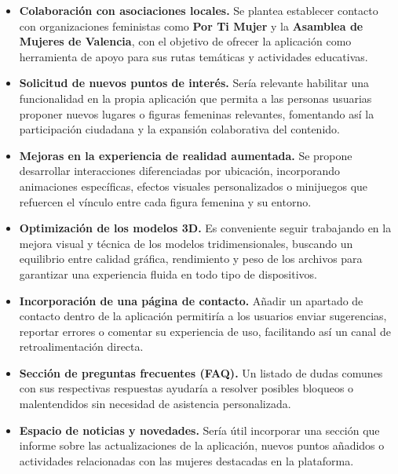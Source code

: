 \begin{itemize}
    \item \textbf{Colaboración con asociaciones locales.} Se plantea establecer contacto con organizaciones feministas como \textbf{Por Ti Mujer} y la \textbf{Asamblea de Mujeres de Valencia}, con el objetivo de ofrecer la aplicación como herramienta de apoyo para sus rutas temáticas y actividades educativas.

    \item \textbf{Solicitud de nuevos puntos de interés.} Sería relevante habilitar una funcionalidad en la propia aplicación que permita a las personas usuarias proponer nuevos lugares o figuras femeninas relevantes, fomentando así la participación ciudadana y la expansión colaborativa del contenido.

    \item \textbf{Mejoras en la experiencia de realidad aumentada.} Se propone desarrollar interacciones diferenciadas por ubicación, incorporando animaciones específicas, efectos visuales personalizados o minijuegos que refuercen el vínculo entre cada figura femenina y su entorno.

    \item \textbf{Optimización de los modelos 3D.} Es conveniente seguir trabajando en la mejora visual y técnica de los modelos tridimensionales, buscando un equilibrio entre calidad gráfica, rendimiento y peso de los archivos para garantizar una experiencia fluida en todo tipo de dispositivos.

    \item \textbf{Incorporación de una página de contacto.} Añadir un apartado de contacto dentro de la aplicación permitiría a los usuarios enviar sugerencias, reportar errores o comentar su experiencia de uso, facilitando así un canal de retroalimentación directa.

    \item \textbf{Sección de preguntas frecuentes (FAQ).} Un listado de dudas comunes con sus respectivas respuestas ayudaría a resolver posibles bloqueos o malentendidos sin necesidad de asistencia personalizada.

    \item \textbf{Espacio de noticias y novedades.} Sería útil incorporar una sección que informe sobre las actualizaciones de la aplicación, nuevos puntos añadidos o actividades relacionadas con las mujeres destacadas en la plataforma.


\end{itemize}

